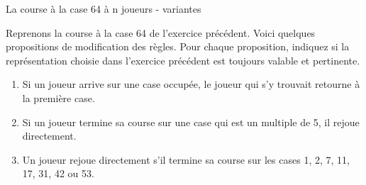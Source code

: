\begin{Exercice}{La course à la case 64 à n joueurs - variantes}

	Reprenons la course à la case 64 de l'exercice précédent.
	Voici quelques propositions de modification des règles.
	Pour chaque proposition, indiquez si la représentation
	choisie dans l'exercice précédent est toujours valable et pertinente.
	\begin{enumerate}
	\item 
		Si un joueur arrive sur une case occupée, 
		le joueur qui s'y trouvait retourne à la première case.
	\item
		Si un joueur termine sa course sur une case qui est un multiple de 5,
		il rejoue directement.
	\item
		Un joueur rejoue directement s'il termine sa course
		sur les cases 1, 2, 7, 11, 17, 31, 42 ou 53.
	\end{enumerate}
	
\end{Exercice}


